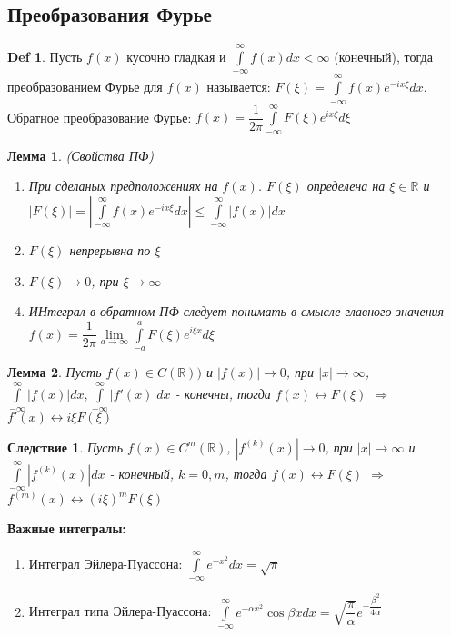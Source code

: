 \documentclass[14pt]{article}
\theoremstyle{plain}
\newtheorem{Lem}{Лемма}
\newtheorem{Sled}{Следствие}
\theoremstyle{definition}
\newtheorem{Def}{Def}
\begin{document}
		\subsection{Преобразования Фурье}
			\begin{Def}
				Пусть $f(x)$ кусочно гладкая и $\int\limits_{-\infty}^{\infty} f(x) dx < \infty$ (конечный), тогда преобразованием Фурье для $f(x)$ называется: $F(\xi) = \int\limits_{-\infty}^{\infty} f(x) e^{-i x\xi} dx$. \newline
				Обратное преобразование Фурье: $f(x) = \dfrac{1}{2\pi} \int\limits_{-\infty}^{\infty} F(\xi) e^{i x \xi} d\xi$		
			\end{Def}
			\begin{Lem}
				(Свойства ПФ)\newline
				\begin{enumerate}
					\item При сделаных предположениях на $f(x)$. $F(\xi)$ определена на $\xi \in \mathbb{R}$ и $|F(\xi)| = |\int\limits_{-\infty}^{\infty} f(x) e^{-i x\xi} dx| \leq \int\limits_{-\infty}^{\infty} |f(x)| dx$
					\item  $F(\xi)$ непрерывна по $\xi$
					\item $F(\xi) \to 0$, при $\xi \to \infty$
					\item ИНтеграл в обратном ПФ следует понимать в смысле главного значения $f(x) = \dfrac{1}{2\pi} \lim\limits_{a \to \infty} \int\limits_{-a}^{a} F(\xi) e^{i \xi x} d\xi$
				\end{enumerate}
			\end{Lem}
			\begin{Lem}
				Пусть $f(x) \in C(\mathbb{R}))$ и $|f(x)| \to 0$, при $|x| \to \infty$, $\int\limits_{-\infty}^{\infty} |f(x)| dx, \int\limits_{-\infty}^{\infty} |f'(x)| dx $ - конечны, тогда $f(x) \leftrightarrow F(\xi)$ $\Rightarrow$ $f'(x) \leftrightarrow i\xi F(\xi)$
			\end{Lem}
			\begin{Sled}
				Пусть $f(x) \in C^m(\mathbb{R})$, $|f^{(k)}(x)| \to 0$, при $|x| \to \infty$ и $\int\limits_{-\infty}^{\infty} |f^{(k)}(x)| dx $ - конечный, $k = 0, m$, тогда $f(x) \leftrightarrow F(\xi)$ $\Rightarrow$ $f^{(m)}(x) \leftrightarrow (i\xi)^m F(\xi)$
			\end{Sled}
			\textbf{Важные интегралы:}
			\begin{enumerate}
				\item Интеграл Эйлера-Пуассона: $\int\limits_{-\infty}^{\infty} e^{-x^2} dx = \sqrt{\pi}$
				\item Интеграл типа Эйлера-Пуассона: $\int\limits_{-\infty}^{\infty} e^{-\alpha x^2} \cos{\beta x} dx = \sqrt{\dfrac{\pi}{\alpha}} e^{-\dfrac{\beta^2}{4 \alpha}}$
			\end{enumerate}
\end{document}

